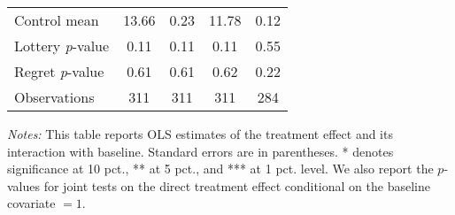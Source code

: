 \begin{table}[htbp]
{\begin{threeparttable}
\begin{tabular}{l*{4}{c}}
Control mean    &    13.66         &     0.23         &    11.78         &     0.12         \\
Lottery \emph{p}-value&     0.11         &     0.11         &     0.11         &     0.55         \\
Regret \emph{p}-value&     0.61         &     0.61         &     0.62         &     0.22         \\
Observations    &      311         &      311         &      311         &      284         \\
\bottomrule \end{tabular} \begin{tablenotes}[flushleft] \footnotesize \item \emph{Notes:} This table reports OLS estimates of the treatment effect and its interaction with baseline. Standard errors are in parentheses. * denotes significance at 10 pct., ** at 5 pct., and *** at 1 pct. level. We also report the \(p\)-values for joint tests on the direct treatment effect conditional on the baseline covariate $= 1$. \end{tablenotes} \end{threeparttable} } \end{table}

